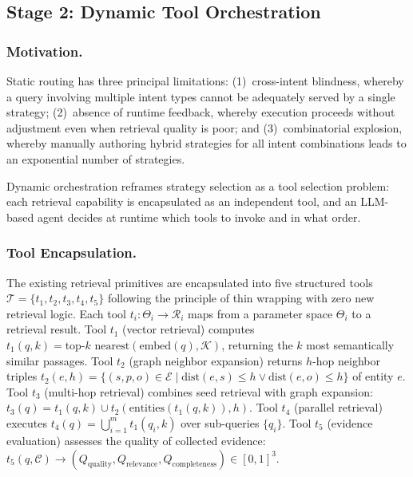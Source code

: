 \documentclass[runningheads]{llncs}
\begin{document}
\subsection{Stage 2: Dynamic Tool Orchestration}

\subsubsection{Motivation.}

Static routing has three principal limitations: (1)~cross-intent blindness, whereby a query involving multiple intent types cannot be adequately served by a single strategy; (2)~absence of runtime feedback, whereby execution proceeds without adjustment even when retrieval quality is poor; and (3)~combinatorial explosion, whereby manually authoring hybrid strategies for all intent combinations leads to an exponential number of strategies.

Dynamic orchestration reframes strategy selection as a tool selection problem: each retrieval capability is encapsulated as an independent tool, and an LLM-based agent decides at runtime which tools to invoke and in what order.

\subsubsection{Tool Encapsulation.}

The existing retrieval primitives are encapsulated into five structured tools $\mathcal{T} = \{t_1, t_2, t_3, t_4, t_5\}$ following the principle of thin wrapping with zero new retrieval logic. Each tool $t_i: \Theta_i \to \mathcal{R}_i$ maps from a parameter space $\Theta_i$ to a retrieval result. Tool $t_1$ (vector retrieval) computes $t_1(q, k) = \text{top-}k\text{ nearest}(\text{embed}(q), \mathcal{K})$, returning the $k$ most semantically similar passages. Tool $t_2$ (graph neighbor expansion) returns $h$-hop neighbor triples $t_2(e, h) = \{(s, p, o) \in \mathcal{E} \mid \text{dist}(e, s) \leq h \vee \text{dist}(e, o) \leq h\}$ of entity $e$. Tool $t_3$ (multi-hop retrieval) combines seed retrieval with graph expansion: $t_3(q) = t_1(q, k) \cup t_2(\text{entities}(t_1(q, k)), h)$. Tool $t_4$ (parallel retrieval) executes $t_4(q) = \bigcup_{i=1}^{m} t_1(q_i, k)$ over sub-queries $\{q_i\}$. Tool $t_5$ (evidence evaluation) assesses the quality of collected evidence: $t_5(q, \mathcal{C}) \to (Q_{\text{quality}}, Q_{\text{relevance}}, Q_{\text{completeness}}) \in [0,1]^3$.
\end{document}
